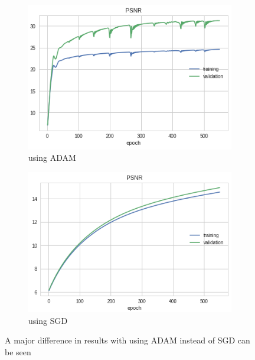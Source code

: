 \documentclass[12pt]{article}
\begin{document}
\begin{figure}[h!]
  \centering
  \begin{subfigure}[b]{0.4\linewidth}
    \includegraphics[width=\linewidth]{psnradam1d.png}
    \caption{using ADAM}
  \end{subfigure}
  \begin{subfigure}[b]{0.4\linewidth}
    \includegraphics[width=\linewidth]{psnrsgd1d.png}
    \caption{using SGD}
  \end{subfigure}
  \caption{A major difference in results with using ADAM instead of SGD can be seen}
  \label{fig:grad_compare_1d}
\end{figure}
\end{document}
